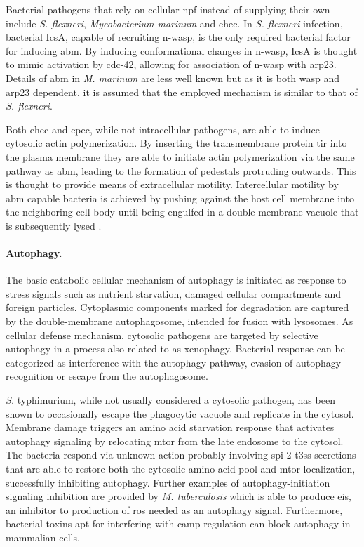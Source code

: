 Bacterial pathogens that rely on cellular \gls{npf} instead of supplying their own include \textit{S. flexneri}, \textit{Mycobacterium marinum}  and \gls{ehec}. In \textit{S. flexneri} infection, bacterial IcsA, capable of recruiting \gls{n-wasp}, is the only required bacterial factor for inducing \gls{abm}. By inducing conformational changes in \gls{n-wasp}, IcsA is thought to mimic activation by \gls{cdc-42}, allowing for association of \gls{n-wasp} with \gls{arp23}. Details of \gls{abm} in \textit{M. marinum} are less well known but as it is both \gls{wasp} and \gls{arp23} dependent, it is assumed that the employed mechanism is similar to that of \textit{S. flexneri}.

Both \gls{ehec} and \gls{epec}, while not intracellular pathogens, are able to induce cytosolic actin polymerization. By inserting the transmembrane protein \gls{tir} into the plasma membrane they are able to initiate actin polymerization via the same pathway as \gls{abm}, leading to the formation of pedestals protruding outwards. This is thought to provide means of extracellular motility. Intercellular motility by \gls{abm} capable bacteria is achieved by pushing against the host cell membrane into the neighboring cell body until being engulfed in a double membrane vacuole that is subsequently lysed \citep{Stevens2006,Haglund2011}.

\label{autophagy}
\paragraph{Autophagy.}
The basic catabolic cellular mechanism of autophagy is initiated as response to stress signals such as nutrient starvation, damaged cellular compartments and foreign particles. Cytoplasmic components marked for degradation are captured by the double-membrane autophagosome, intended for fusion with lysosomes. As cellular defense mechanism, cytosolic pathogens are targeted by selective autophagy in a process also related to as xenophagy. Bacterial response can be categorized as interference with the autophagy pathway, evasion of autophagy recognition or escape from the autophagosome.

\textit{S.} typhimurium, while not usually considered a cytosolic pathogen, has been shown to occasionally escape the phagocytic vacuole and replicate in the cytosol. Membrane damage triggers an amino acid starvation response that activates autophagy signaling by relocating \gls{mtor} from the late endosome to the cytosol. The bacteria respond via unknown action probably involving \acrshort{spi}-2 \gls{t3ss} secretions that are able to restore both the cytosolic amino acid pool and \gls{mtor} localization, successfully inhibiting autophagy. Further examples of autophagy-initiation signaling inhibition are provided by \textit{M. tuberculosis} which is able to produce \gls{eis}, an inhibitor to production of \gls{ros} needed as an autophagy signal. Furthermore, bacterial toxins apt for interfering with \gls{camp} regulation can block autophagy in mammalian cells.

